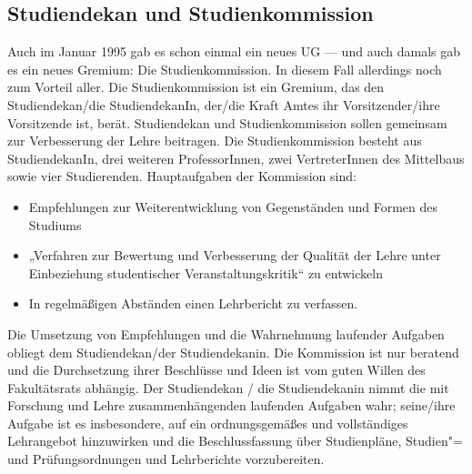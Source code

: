 \subsection{Studiendekan und Studienkommission}

Auch im Januar 1995 gab es schon einmal ein neues UG — und auch damals gab es ein
neues Gremium: Die Studienkommission. In diesem Fall allerdings noch zum Vorteil
aller. Die Studienkommission ist ein Gremium, das den Studiendekan/die
StudiendekanIn, der/die Kraft Amtes ihr Vorsitzender/ihre Vorsitzende ist, berät.
Studiendekan und Studienkommission sollen gemeinsam zur Verbesserung der Lehre
beitragen. Die Studienkommission besteht aus StudiendekanIn, drei weiteren
ProfessorInnen, zwei VertreterInnen des Mittelbaus sowie vier Studierenden.
Hauptaufgaben der Kommission sind:
\begin{itemize}
    \addtolength{\itemsep}{-0.7\baselineskip}
    \item Empfehlungen zur Weiterentwicklung von Gegenständen und Formen des Studiums
    \item „Verfahren zur Bewertung und Verbesserung  der Qualität der Lehre unter
          Einbeziehung studentischer Veranstaltungskritik“ zu entwickeln
    \item In regelmäßigen Abständen einen Lehrbericht zu verfassen.
\end{itemize}


Die Umsetzung von Empfehlungen und die Wahrnehmung laufender Aufgaben
obliegt dem Studiendekan/der Studiendekanin. Die Kommission ist nur
beratend und die Durchsetzung ihrer Beschlüsse und Ideen ist vom guten
Willen des Fakultätsrats abhängig. Der Studiendekan / die Studiendekanin
nimmt die mit Forschung und Lehre zusammenhängenden laufenden Aufgaben
wahr; seine/ihre Aufgabe ist es insbesondere, auf ein ordnungsgemäßes und
vollständiges Lehrangebot hinzuwirken und die Beschlussfassung über
Studienpläne, Studien"= und Prüfungsordnungen und Lehrberichte
vorzubereiten.


